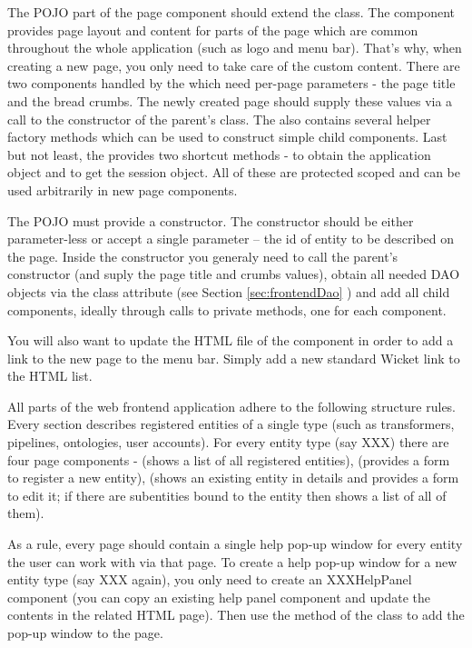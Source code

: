 The POJO part of the page component should extend the  class. The  component provides page layout and content for parts of the page which are common throughout the whole application (such as logo and menu bar). That's why, when creating a new page, you only need to take care of the custom content. There are two components handled by the  which need per-page parameters - the page title and the bread crumbs. The newly created page should supply these values via a call to the constructor of the parent's class. The  also contains several helper factory methods which can be used to construct simple child components. Last but not least, the  provides two shortcut methods -  to obtain the application object and  to get the session object. All of these are protected scoped and can be used arbitrarily in new page components.

The POJO must provide a constructor. The constructor should be either parameter-less or accept a single parameter -- the id of entity to be described on the page. Inside the constructor you generaly need to call the parent's constructor (and suply the page title and crumbs values), obtain all needed DAO objects via the  class attribute (see Section \ref{sec:frontendDao} ) and add all child components, ideally through calls to private methods, one for each component.

You will also want to update the HTML file of the  component in order to add a link to the new page to the menu bar. Simply add a new standard Wicket link to the HTML list.

All parts of the web frontend application adhere to the following structure rules. Every section describes registered entities of a single type (such as transformers, pipelines, ontologies, user accounts). For every entity type (say XXX) there are four page components -  (shows a list of all registered entities),  (provides a form to register a new entity),  (shows an existing entity in details and provides a form to edit it; if there are subentities bound to the entity then shows a list of all of them).

As a rule, every page should contain a single help pop-up window for every entity the user can work with via that page. To create a help pop-up window for a new entity type (say XXX again), you only need to create an XXXHelpPanel component (you can copy an existing help panel component and update the contents in the related HTML page). Then use the  method of the  class to add the pop-up window to the page.


